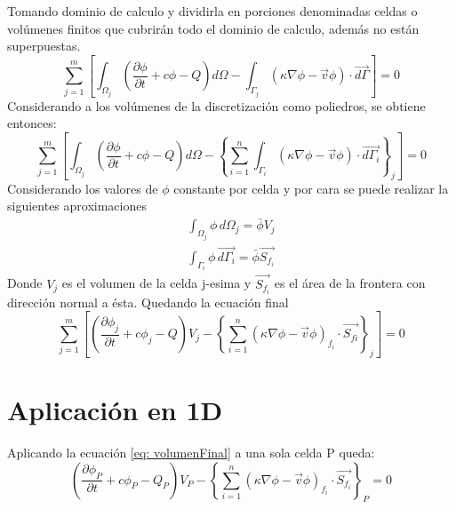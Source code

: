 \documentclass{article}
\begin{document}
    Tomando dominio de calculo y dividirla en porciones denominadas celdas o volúmenes finitos que cubrirán todo el dominio de calculo, además no están superpuestas.
    \begin{equation}
        \sum_{j=1}^{m} \left[ \int_{\Omega_j} \left( \dfrac {{ \partial \phi}} {{ \partial t}} + c \phi - Q \right) d\Omega - \int_{\Gamma_j} \left( \kappa \nabla \phi- \vec{v}\phi \right) \cdot \vec{d\Gamma} \right] = 0
    \end{equation}
    Considerando a los volúmenes de la discretización como poliedros, se obtiene entonces:
    \begin{equation}
        \sum_{j=1}^{m} \left[ \int_{\Omega_j} \left( \dfrac {{ \partial \phi}} {{ \partial t}} + c \phi - Q \right) d\Omega - \left\{ \sum_{i=1}^{n} \int_{\Gamma_i} \left( \kappa \nabla \phi - \vec{v}\phi \right) \cdot \vec{d\Gamma_i} \right\}_j \right] = 0
    \end{equation}
    Considerando los valores de $\phi$ constante por celda y por cara se puede realizar la siguientes aproximaciones
    \begin{equation}
        \begin{aligned}
            \int_{\Omega_j} \phi \, d\Omega_j = \bar{\phi}V_j \\
            \int_{\Gamma_i} \phi \, \vec{d\Gamma_i} = \bar{\phi} \vec{S_{f_i}}    
        \end{aligned}
    \end{equation}
    Donde $V_j$ es el volumen de la celda j-esima y $\vec{S_{f_i}}$ es el área de la frontera con dirección normal a ésta. 
    Quedando la ecuación final
    \begin{equation}
        \sum_{j=1}^{m} \left[ \left( \dfrac {{ \partial \phi_j}} {{ \partial t}} + c \phi_j - Q \right) V_j - \left\{ \sum_{i=1}^{n} \left( \kappa \nabla \phi - \vec{v}\phi \right)_{f_i} \cdot \vec{S_{fi}} \right\}_j \right] = 0
        \label{eq: volumenFinal}
    \end{equation}
\section{Aplicación en 1D} 
    
    Aplicando la ecuación \ref{eq: volumenFinal} a una sola celda P queda:
    \begin{equation}
        \left( \dfrac { \partial \phi_P} {{ \partial t}} + c \phi_P - Q_P \right) V_P - \left\{ \sum_{i=1}^{n} \left( \kappa \nabla \phi - \vec{v}\phi \right)_{f_i} \cdot \vec{S_{f_i}} \right\}_P= 0
        \label{eq: celdaPGeneral}
    \end{equation}
    
\end{document}
